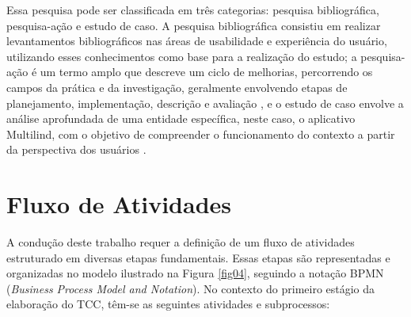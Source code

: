 Essa pesquisa pode ser classificada em três categorias: pesquisa bibliográfica, pesquisa-ação e estudo de caso. A pesquisa bibliográfica consistiu em realizar levantamentos bibliográficos nas áreas de usabilidade e experiência do usuário, 
utilizando esses conhecimentos como base para a realização do estudo; a pesquisa-ação é um termo amplo que descreve um ciclo de melhorias, percorrendo os campos da prática e da investigação, geralmente envolvendo etapas de planejamento, 
implementação, descrição e avaliação \cite{tripp2005}, e o estudo de caso envolve a análise aprofundada de uma entidade específica, neste caso, o aplicativo Multilind, com o objetivo de compreender o funcionamento do contexto a partir da perspectiva 
dos usuários \cite{gerhardt2009}.

\section{Fluxo de Atividades}
\label{sec:Fluxo de Atividades}
A condução deste trabalho requer a definição de um fluxo de atividades estruturado em diversas etapas fundamentais. Essas etapas são representadas e organizadas no modelo ilustrado na Figura \ref{fig04}, seguindo a notação BPMN (\textit{Business Process Model and Notation}). 
No contexto do primeiro estágio da elaboração do TCC, têm-se as seguintes atividades e subprocessos:

